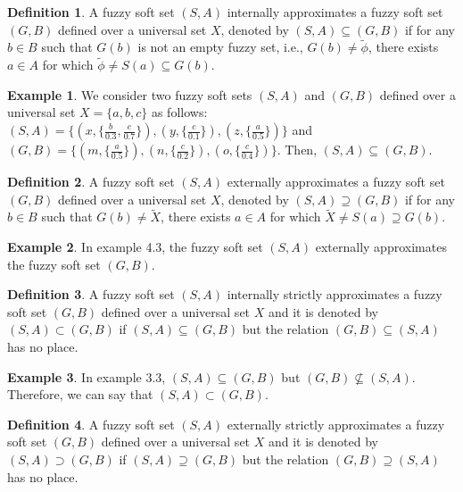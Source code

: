 \documentclass{article}
\theoremstyle{definition}
\newtheorem{definition}{Definition}[section]
\newtheorem{example}{Example}[section]
\begin{document}
\begin{definition}
    A fuzzy soft set $(S,A)$ internally approximates a fuzzy soft set $(G,B)$ defined over a universal set $X$, denoted by $(S,A)\subseteq (G,B)$ if for any $b\in B$ such that $G(b)$ is not an empty fuzzy set, i.e., $G(b)\neq \tilde{\phi}$, there exists $ a \in A$ for which $\tilde{\phi} \neq S(a) \subseteq G(b)$.
    
\end{definition}

\begin{example}
    We consider two fuzzy soft sets $(S,A)$ and $(G,B)$ defined over a universal set $X=\{a, b, c\}$ as follows: $(S,A)=\{(x, \{\frac{b}{0.3}, \frac{c}{0.7}\}), (y, \{\frac{c}{0.1}\}), (z,\{\frac{a}{0.5}\})\}$ and $(G,B)=\{(m, \{\frac{a}{0.5}\}), (n, \{\frac{c}{0.2}\}), (o,\{\frac{c}{0.4}\})\}$. Then, $(S,A)\subseteq (G,B)$.
\end{example}
\begin{definition}
      A fuzzy soft set $(S,A)$ externally  approximates a fuzzy soft set $(G,B)$ defined over a universal set $X$, denoted by $(S,A)\supseteq (G,B)$ if for any $b\in B$ such that $G(b)\neq \tilde{X}$, there exists $a \in A$ for which $\tilde{X} \neq S(a) \supseteq G(b)$.
\end{definition}

\begin{example}
    In example 4.3, the fuzzy soft set $(S,A)$ externally approximates the fuzzy soft set $(G,B)$.
\end{example}

\begin{definition}
    A fuzzy soft set $(S,A)$ internally strictly approximates a fuzzy soft set $(G,B)$ defined over a universal set $X$ and it is denoted by $(S,A)\subset (G,B)$ if $(S,A)\subseteq (G,B)$ but the relation $(G,B)\subseteq (S,A)$ has no place.
\end{definition}

\begin{example}
    In example 3.3, $(S,A)\subseteq (G,B)$ but
    $(G,B)\nsubseteq (S,A)$. Therefore, we can say that $(S,A)\subset (G,B)$.
\end{example}

\begin{definition}
     A fuzzy soft set $(S,A)$ externally strictly approximates a fuzzy soft set $(G,B)$ defined over a universal set $X$ and it is denoted by $(S,A)\supset (G,B)$ if $(S,A)\supseteq (G,B)$ but the relation $(G,B)\supseteq (S,A)$ has no place.
\end{definition}
\end{document}
